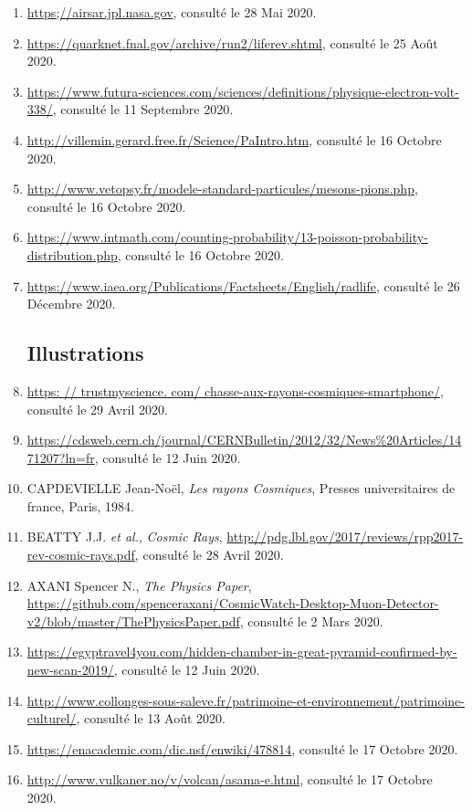\documentclass[a4paper, 12pt]{article}
\begin{document}
\begin{spacing}{1.5}
\begin{enumerate}
  \item \url{https;//airsar.jpl.nasa.gov}, consulté le 28 Mai 2020.
  \item \url{https://quarknet.fnal.gov/archive/run2/liferev.shtml}, consulté le 25 Août 2020.
  \item \url{https://www.futura-sciences.com/sciences/definitions/physique-electron-volt-338/}, consulté le 11 Septembre 2020.
  \item \url{http://villemin.gerard.free.fr/Science/PaIntro.htm}, consulté le 16 Octobre 2020.
  \item \url{http://www.vetopsy.fr/modele-standard-particules/mesons-pions.php}, consulté le 16 Octobre 2020.
  \item \url{https://www.intmath.com/counting-probability/13-poisson-probability-distribution.php}, consulté le 16 Octobre 2020.
  \item \url{https://www.iaea.org/Publications/Factsheets/English/radlife}, consulté le 26 Décembre 2020.

\subsection{Illustrations}

  \item \url{https: // trustmyscience. com/ chasse-aux-rayons-cosmiques-smartphone/}, consulté le 29 Avril 2020.
  \item \url{https://cdsweb.cern.ch/journal/CERNBulletin/2012/32/News%20Articles/1471207?ln=fr}, consulté le 12 Juin 2020.
  \item CAPDEVIELLE Jean-Noël, \emph{Les rayons Cosmiques}, Presses universitaires de france, Paris, 1984.
  \item BEATTY J.J. \emph{et al.}, \emph{Cosmic Rays}, \url{http://pdg.lbl.gov/2017/reviews/rpp2017-rev-cosmic-rays.pdf}, consulté le 28 Avril 2020.
  \item AXANI Spencer N., \emph{The Physics Paper}, \url{https://github.com/spenceraxani/CosmicWatch-Desktop-Muon-Detector-v2/blob/master/ThePhysicsPaper.pdf}, consulté le 2 Mars 2020.
  \item \url{https://egyptravel4you.com/hidden-chamber-in-great-pyramid-confirmed-by-new-scan-2019/}, consulté le 12 Juin 2020.
  \item \url{http://www.collonges-sous-saleve.fr/patrimoine-et-environnement/patrimoine-culturel/}, consulté le 13 Août 2020.
  \item \url{https://enacademic.com/dic.nsf/enwiki/478814}, consulté le 17 Octobre 2020.
  \item \url{http://www.vulkaner.no/v/volcan/asama-e.html}, consulté le 17 Octobre 2020.




\end{enumerate}
\end{spacing}
\end{document}
